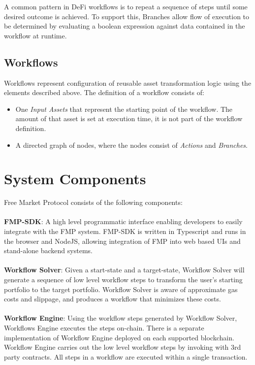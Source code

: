 \documentclass[oneside]{article}
\begin{document}
A common pattern in DeFi workflows is to repeat a sequence of steps until some desired outcome is achieved.  
To support this, Branches allow flow of execution to be determined by evaluating a boolean expression against data contained in the workflow at runtime.  

\subsection*{Workflows}
Workflows represent configuration of reusable asset transformation logic using the elements described above.  The definition of a workflow consists of:
\begin{itemize}
  \item One \textit{Input Assets} that represent the starting point of the workflow.  
  The amount of that asset is set at execution time, it is not part of the workflow definition. 
  \item A directed graph of nodes, where the nodes consist of \textit{Actions} and \textit{Branches}.  
\end{itemize}

\section*{System Components}
Free Market Protocol consists of the following components:
\\
\\
\noindent \textbf{FMP-SDK}:  A high level programmatic interface enabling developers to easily integrate with the FMP system. FMP-SDK is written in Typescript and runs in the browser and NodeJS, allowing integration of FMP into web based UIs and stand-alone backend systems.
\\
\\
\noindent \textbf{Workflow Solver}:  Given a start-state and a target-state, Workflow Solver will generate a sequence of low level workflow steps to transform the user's starting portfolio to the target portfolio.  Workflow Solver is aware of approximate gas costs and slippage, and produces a workflow that minimizes these costs. 
\\
\\
\noindent \textbf{Workflow Engine}:  Using the workflow steps generated by Workflow Solver, Workflows Engine executes the steps on-chain.  
There is a separate implementation of Workflow Engine deployed on each supported blockchain.  
Workflow Engine carries out the low level workflow steps by invoking with 3rd party contracts. 
All steps in a workflow are executed within a single transaction.
\end{document}
